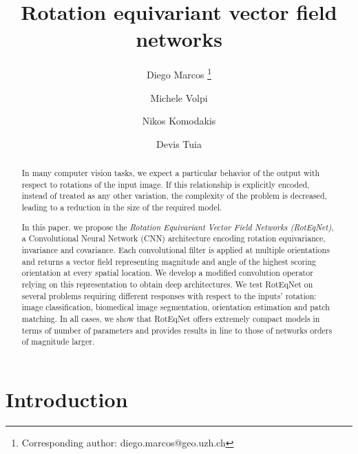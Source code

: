 \documentclass[10pt,twocolumn,letterpaper,table]{article}
\begin{document}
	
\title{Rotation equivariant vector field networks}
    
    \author[1]{Diego Marcos \thanks{Corresponding author: diego.marcos@geo.uzh.ch}}
    \author[1]{Michele Volpi}
    \author[2]{Nikos Komodakis}
    \author[1]{Devis Tuia}
    


	
	


\maketitle


\begin{abstract}
In many computer vision tasks, we expect a particular behavior of the output with respect to rotations of the input image. If this relationship is explicitly encoded, instead of treated as any other variation, the complexity of the problem is decreased, leading to a reduction in the size of the required model. 
  
In this paper, we propose the \emph{Rotation Equivariant Vector Field Networks (RotEqNet)}, a Convolutional Neural Network (CNN) architecture encoding rotation equivariance, invariance and covariance.
Each convolutional filter is applied at multiple orientations and returns a vector field representing magnitude and angle of the highest scoring orientation at every spatial location. We develop a modified convolution operator relying on this representation to obtain deep architectures. 
We test RotEqNet on several problems requiring different responses with respect to the inputs' rotation: image classification, biomedical image segmentation, orientation estimation and patch matching. In all cases, we show that RotEqNet offers extremely compact models in terms of number of parameters and provides results in line to those of networks orders of magnitude larger.
\end{abstract}
\vspace*{-8mm}
	
\section{Introduction}
	
\end{document}
